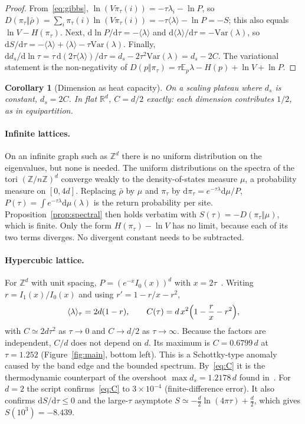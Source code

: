 \documentclass[11pt]{article}
\newtheorem{corollary}{Corollary}[section]
\theoremstyle{remark}\newtheorem*{remark}{Remark}
\newcommand{\dd}{\mathrm{d}}
\newcommand{\Var}{\mathrm{Var}}
\newcommand{\RR}{\mathbb{R}}
\newcommand{\ZZ}{\mathbb{Z}}
\begin{document}
\begin{proof}
From~\eqref{eq:gibbs}, $\ln(V\pi_\tau(i))=-\tau\lambda_i-\ln P$, so $D(\pi_\tau\Vert\bar\rho)=\sum_i\pi_\tau(i)\ln
(V\pi_\tau(i))=-\tau\langle\lambda\rangle-\ln P=-S$; this also equals $\ln V-H(\pi_\tau)$. Next,
$\dd\ln P/\dd\tau=-\langle\lambda\rangle$ and $\dd\langle\lambda\rangle/\dd\tau=-\Var(\lambda)$, so
$\dd S/\dd\tau=-\langle\lambda\rangle+\langle\lambda\rangle-\tau\Var(\lambda)$. Finally,
$\dd d_s/\dd\ln\tau=\tau\,\dd(2\tau\langle\lambda\rangle)/\dd\tau=d_s-2\tau^2\Var(\lambda)=d_s-2C$. The variational
statement is the non-negativity of $D(p\Vert\pi_\tau)=\tau\mathbb E_p\lambda-H(p)+\ln V+\ln P$.
\end{proof}

\begin{corollary}[Dimension as heat capacity]
\label{cor:equipartition}
On a scaling plateau where $d_s$ is constant, $d_s=2C$. In flat $\RR^d$, $C=d/2$ exactly: each dimension
contributes $1/2$, as in equipartition.
\end{corollary}

\paragraph{Infinite lattices.}
On an infinite graph such as $\ZZ^d$ there is no uniform distribution on the eigenvalues, but none is needed. The
uniform distributions on the spectra of the tori $(\ZZ/n\ZZ)^d$ converge weakly to the density-of-states measure
$\mu$, a probability measure on $[0,4d]$. Replacing $\bar\rho$ by $\mu$ and $\pi_\tau$ by $\dd\pi_\tau=e^{-\tau\lambda}\dd\mu/P$,
$P(\tau)=\int e^{-\tau\lambda}\dd\mu(\lambda)$ is the return probability per site. Proposition~\ref{prop:spectral}
then holds verbatim with $S(\tau)=-D(\pi_\tau\Vert\mu)$, which is finite. Only the form $H(\pi_\tau)-\ln V$ has no
limit, because each of its two terms diverges. No divergent constant needs to be subtracted.

\paragraph{Hypercubic lattice.}
For $\ZZ^d$ with unit spacing, $P=(e^{-x}I_0(x))^d$ with $x=2\tau$~\cite{Chen2026_qgc}. Writing $r=I_1(x)/I_0(x)$
and using $r'=1-r/x-r^2$,
\begin{equation}
\langle\lambda\rangle_\tau=2d(1-r),\qquad
C(\tau)=d\,x^2\Bigl(1-\frac rx-r^2\Bigr),
\label{eq:Clattice}
\end{equation}
with $C\simeq2d\tau^2$ as $\tau\to0$ and $C\to d/2$ as $\tau\to\infty$. Because the factors are independent, $C/d$
does not depend on $d$. Its maximum is $C=0.6799\,d$ at $\tau=1.252$ (Figure~\ref{fig:main}, bottom left). This is
a Schottky-type anomaly caused by the band edge and the bounded spectrum. By~\eqref{eq:C} it is the
thermodynamic counterpart of the overshoot $\max d_s=1.2178\,d$ found in~\cite{Chen2026_qgc}. For $d=2$ the script
confirms~\eqref{eq:C} to $3\times10^{-4}$ (finite-difference error). It also confirms $\dd S/\dd\tau\le0$ and the
large-$\tau$ asymptote $S\simeq-\tfrac d2\ln(4\pi\tau)+\tfrac d2$, which gives $S(10^3)=-8.439$.
\end{document}
